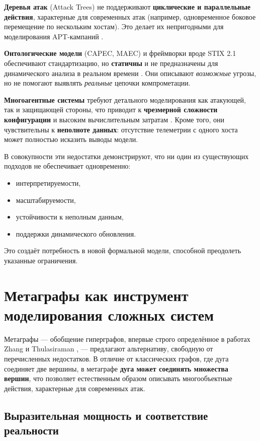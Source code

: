 \textbf{Деревья атак} (Attack Trees) не поддерживают \textbf{циклические и параллельные действия}, характерные для современных атак (например, одновременное боковое перемещение по нескольким хостам). Это делает их непригодными для моделирования APT-кампаний \cite{Lallie2019}.

\textbf{Онтологические модели} (CAPEC, MAEC) и фреймворки вроде STIX 2.1 обеспечивают стандартизацию, но \textbf{статичны} и не предназначены для динамического анализа в реальном времени \cite{Gorbachev2018}. Они описывают \textit{возможные} угрозы, но не помогают выявлять \textit{реальные} цепочки компрометации.

\textbf{Многоагентные системы} требуют детального моделирования как атакующей, так и защищающей стороны, что приводит к \textbf{чрезмерной сложности конфигурации} и высоким вычислительным затратам \cite{Zegzhda2016}. Кроме того, они чувствительны к \textbf{неполноте данных}: отсутствие телеметрии с одного хоста может полностью исказить выводы модели.

В совокупности эти недостатки демонстрируют, что ни один из существующих подходов не обеспечивает одновременно:
\begin{itemize}
    \item интерпретируемости,
    \item масштабируемости,
    \item устойчивости к неполным данным,
    \item поддержки динамического обновления.
\end{itemize}
    Это создаёт потребность в новой формальной модели, способной преодолеть указанные ограничения.

\section{Метаграфы как инструмент моделирования сложных систем}

Метаграфы — обобщение гиперграфов, впервые строго определённое в работах Zhang и Thulasiraman \cite{Zhang2006}, — предлагают альтернативу, свободную от перечисленных недостатков. В отличие от классических графов, где дуга соединяет две вершины, в метаграфе \textbf{дуга может соединять множества вершин}, что позволяет естественным образом описывать многообъектные действия, характерные для современных атак.

\subsection{Выразительная мощность и соответствие реальности}

